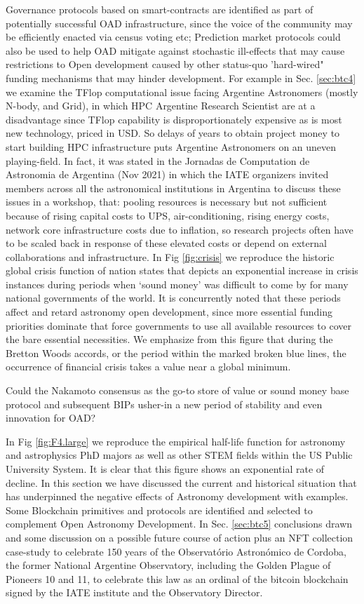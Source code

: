 \documentclass[final,5p,times,twocolumn,authoryear]{elsarticle}
\begin{document}
Governance protocols based on smart-contracts are identified as part of potentially successful OAD infrastructure, since the voice of the community may be efficiently enacted via census voting etc; Prediction market protocols could also be used to help OAD mitigate against stochastic ill-effects that may cause restrictions to Open development caused by other status-quo 'hard-wired" funding mechanisms that may hinder development. For example in Sec. \ref{sec:btc4} we examine the TFlop computational issue facing Argentine Astronomers (mostly N-body, and Grid), in which HPC Argentine Research Scientist are at a disadvantage since TFlop capability is disproportionately expensive as is most new technology, priced in USD. So delays of years to obtain project money to start building HPC infrastructure puts Argentine Astronomers on an uneven playing-field. In fact, it was stated in the Jornadas de Computation de Astronomia de Argentina (Nov 2021)  in which the IATE organizers invited members across all the astronomical institutions in Argentina to discuss these issues in a workshop, that: pooling resources is necessary but not sufficient because of rising capital costs to UPS, air-conditioning, rising energy costs, network core infrastructure costs due to inflation, so research projects often have to be scaled back in response of these elevated costs or depend on external collaborations and infrastructure. In Fig \ref{fig:crisis} we reproduce the historic global crisis function of nation states that depicts an exponential increase in crisis instances during periods when `sound money' was difficult to come by for many national governments of the world. It is concurrently noted that these periods affect and retard astronomy open development, since more essential funding priorities dominate that force governments to use all available resources to cover the bare essential necessities. We emphasize from this figure that during the Bretton Woods accords, or the period within the marked broken blue lines, the occurrence of financial crisis takes a value near a global minimum. 

Could the Nakamoto consensus as the go-to store of value or sound money base protocol and subsequent BIPs usher-in a new period of stability and even innovation for OAD? 

In Fig \ref{fig:F4.large} we reproduce the empirical half-life function for astronomy and astrophysics PhD majors as well as other STEM fields within the US Public University System. It is clear that this figure shows an exponential rate of decline.  In this section we have discussed the current and historical situation that has underpinned the negative effects of Astronomy development with examples. Some Blockchain primitives and protocols are identified and selected to complement Open Astronomy Development.  In Sec. \ref{sec:btc5} conclusions drawn and some discussion on a possible future course of action plus an NFT collection case-study to celebrate 150 years of the Observat\'orio Astron\'omico de Cordoba, the former National Argentine Observatory, including the Golden Plague of Pioneers 10 and 11, to celebrate this law as an ordinal of the bitcoin blockchain signed by the IATE institute and the Observatory Director. 
\end{document}
